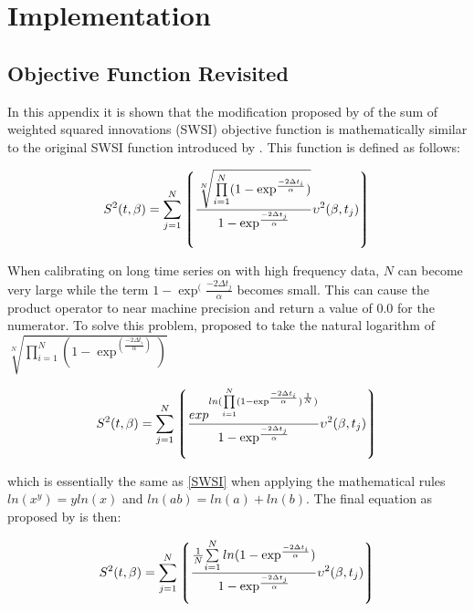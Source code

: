 \chapter{Implementation}

\section{Objective Function Revisited}
In this appendix it is shown that the modification proposed by \citet{peterson_nonlinear_2014} of the sum of weighted squared innovations (SWSI) objective function is mathematically similar to the original SWSI function introduced by \citet{von_asmuth_modeling_2005}. This function is defined as follows:

\begin{equation} \label{SWSI}
S^2(t,\beta) = \sum\limits_{j=1}^N \left\lgroup  \frac{ \sqrt[N]{ \prod\limits_{i=1}^N ( 1 - \exp^ \frac{-2 \Delta{t_i}}{\alpha} )  }}{ 1 - \exp^ \frac{-2 \Delta{t_j}}{\alpha} } \upsilon^2(\beta,t_j)    \right\rgroup
\end{equation}

When calibrating on long time series on with high frequency data, $N$ can become very large while the term $ 1 - \exp^( \frac{-2 \Delta{t_j}}{\alpha} $ becomes small. This can cause the product operator to near machine precision and return a value of 0.0 for the numerator. To solve this problem, \citet{peterson_nonlinear_2014} proposed to take the natural logarithm of $ { \sqrt[N]{ \prod\limits_{i=1}^N ( 1 - \exp^( \frac{-2 \Delta{t_i}}{\alpha} ) )  }} $

\begin{equation}
S^2(t,\beta) = \sum\limits_{j=1}^N \left\lgroup  \frac{ exp ^ { ln ({ \prod\limits_{i=1}^N ( 1 - \exp^ \frac{-2 \Delta{t_i}}{\alpha} )^ \frac{1}{N} ) } }}{ 1 - \exp^ \frac{-2 \Delta{t_j}}{\alpha} } \upsilon^2(\beta,t_j)    \right\rgroup
\end{equation}

which is essentially the same as \eqref{SWSI} when applying the mathematical rules $ ln(x^y) = y ln(x) $ and $ ln(ab) = ln(a) + ln(b) $. The final equation as proposed by \citet{peterson_nonlinear_2014} is then:

\begin{equation} \label{SWSI_adapted}
S^2(t,\beta) = \sum\limits_{j=1}^N \left\lgroup  \frac{ \frac{1}{N}{ \sum\limits_{i=1}^N ln( 1 - \exp^ \frac{-2 \Delta{t_i}}{\alpha} )  }}{ 1 - \exp^ \frac{-2 \Delta{t_j}}{\alpha} } \upsilon^2(\beta,t_j)    \right\rgroup
\end{equation}

